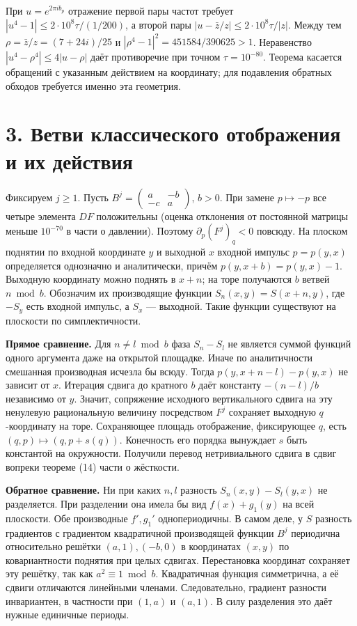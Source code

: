 \documentclass[11pt,a4paper]{article}
\newcommand{\sect}[1]{\section*{\sffamily\color{ink}#1}}
\begin{document}
При $u=e^{2\pi i b_p}$ отражение первой пары частот требует $|u^4-1|\le2\cdot10^8\tau/(1/200)$, а второй пары $|u-\bar z/z|\le2\cdot10^8\tau/|z|$. Между тем $\rho=\bar z/z=(7+24i)/25$ и $|\rho^4-1|^2=451584/390625>1$. Неравенство $|u^4-\rho^4|\le4|u-\rho|$ даёт противоречие при точном $\tau=10^{-80}$. Теорема касается обращений с указанным действием на координату; для подавления обратных обходов требуется именно эта геометрия.
\newpage
\sect{3. Ветви классического отображения и их действия}
Фиксируем $j\ge1$. Пусть $B^j=\left(\begin{smallmatrix}a&-b\\-c&a\end{smallmatrix}\right)$, $b>0$. При замене $p\mapsto-p$ все четыре элемента $DF$ положительны (оценка отклонения от постоянной матрицы меньше $10^{-70}$ в части о давлении). Поэтому $\partial_p(F^j)_q<0$ повсюду. На плоском поднятии по входной координате $y$ и выходной $x$ входной импульс $p=p(y,x)$ определяется однозначно и аналитически, причём $p(y,x+b)=p(y,x)-1$. Выходную координату можно поднять в $x+n$; на торе получаются $b$ ветвей $n\bmod b$. Обозначим их производящие функции $S_n(x,y)=S(x+n,y)$, где $-S_y$ есть входной импульс, а $S_x$ --- выходной. Такие функции существуют на плоскости по симплектичности.

\textbf{Прямое сравнение.} Для $n\ne l\bmod b$ фаза $S_n-S_l$ не является суммой функций одного аргумента даже на открытой площадке. Иначе по аналитичности смешанная производная исчезла бы всюду. Тогда $p(y,x+n-l)-p(y,x)$ не зависит от $x$. Итерация сдвига до кратного $b$ даёт константу $-(n-l)/b$ независимо от $y$. Значит, сопряжение исходного вертикального сдвига на эту ненулевую рациональную величину посредством $F^j$ сохраняет выходную $q$-координату на торе. Сохраняющее площадь отображение, фиксирующее $q$, есть $(q,p)\mapsto(q,p+s(q))$. Конечность его порядка вынуждает $s$ быть константой на окружности. Получили перевод нетривиального сдвига в сдвиг вопреки теореме (14) части о жёсткости.

\textbf{Обратное сравнение.} Ни при каких $n,l$ разность $S_n(x,y)-S_l(y,x)$ не разделяется. При разделении она имела бы вид $f(x)+g_1(y)$ на всей плоскости. Обе производные $f',g_1'$ однопериодичны. В самом деле, у $S$ разность градиентов с градиентом квадратичной производящей функции $B^j$ периодична относительно решётки $(a,1),(-b,0)$ в координатах $(x,y)$ по ковариантности поднятия при целых сдвигах. Перестановка координат сохраняет эту решётку, так как $a^2\equiv1\bmod b$. Квадратичная функция симметрична, а её сдвиги отличаются линейными членами. Следовательно, градиент разности инвариантен, в частности при $(1,a)$ и $(a,1)$. В силу разделения это даёт нужные единичные периоды.
\end{document}
